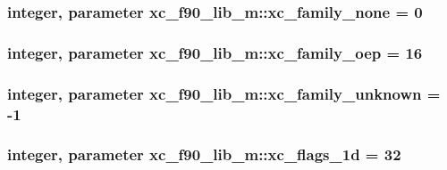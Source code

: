 \hypertarget{classxc__f90__lib__m_a81e78be5ade262df9cd5d7f240a9a4f4}{
\subsubsection[{xc\-\_\-family\-\_\-none}]{\setlength{\rightskip}{0pt plus 5cm}integer, parameter xc\-\_\-f90\-\_\-lib\-\_\-m\-::xc\-\_\-family\-\_\-none = 0}}\label{classxc__f90__lib__m_a81e78be5ade262df9cd5d7f240a9a4f4}
\hypertarget{classxc__f90__lib__m_a6f366282a2a2d9c0ab1c218d6106d106}{
\subsubsection[{xc\-\_\-family\-\_\-oep}]{\setlength{\rightskip}{0pt plus 5cm}integer, parameter xc\-\_\-f90\-\_\-lib\-\_\-m\-::xc\-\_\-family\-\_\-oep = 16}}\label{classxc__f90__lib__m_a6f366282a2a2d9c0ab1c218d6106d106}
\hypertarget{classxc__f90__lib__m_a72feb122f223775b0ed8621072aa0691}{
\subsubsection[{xc\-\_\-family\-\_\-unknown}]{\setlength{\rightskip}{0pt plus 5cm}integer, parameter xc\-\_\-f90\-\_\-lib\-\_\-m\-::xc\-\_\-family\-\_\-unknown = -\/1}}\label{classxc__f90__lib__m_a72feb122f223775b0ed8621072aa0691}
\hypertarget{classxc__f90__lib__m_aef600ee15c663a94223a9cb7e7e9b144}{
\subsubsection[{xc\-\_\-flags\-\_\-1d}]{\setlength{\rightskip}{0pt plus 5cm}integer, parameter xc\-\_\-f90\-\_\-lib\-\_\-m\-::xc\-\_\-flags\-\_\-1d = 32}}\label{classxc__f90__lib__m_aef600ee15c663a94223a9cb7e7e9b144}
